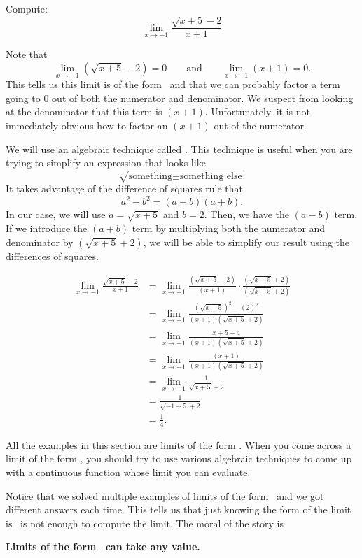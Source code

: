 \documentclass{ximera}
\begin{document}
\begin{example}
  Compute:
  \[
  \lim_{x\to-1} \frac{\sqrt{x+5}-2}{x+1}
  \]

\begin{explanation} 
  Note that 
  \[
  \lim_{x\to-1} \left(\sqrt{x+5}-2\right)=0\qquad\text{and}\qquad\lim_{x\to -1} \left(x+1\right) =0.
  \]
  This tells us this limit is of the form \zeroOverZero\ and that we
  can probably factor a term going to $0$ out of both the numerator
  and denominator.  We suspect from looking at the denominator that
  this term is $(x+1)$.  Unfortunately, it is not immediately obvious
  how to factor an $(x+1)$ out of the numerator.
 
  We will use an algebraic technique called .  This technique is useful when you are trying to
  simplify an expression that looks like
  \[
  \sqrt{\text{something} \pm \text{something else}}.
  \]
  It takes advantage of the difference of squares rule that
  \[
  a^2-b^2=(a-b)(a+b).
  \]
  In our case, we will use $a=\sqrt{x+5}$ and $b=2$.  Then, we have
  the $(a-b)$ term.  If we introduce the $(a+b)$ term by multiplying
  both the numerator and denominator by $(\sqrt{x+5}+2)$, we will be
  able to simplify our result using the differences of squares.
 
\begin{align*}
\lim_{x\to-1} \frac{\sqrt{x+5}-2}{x+1}&=
\lim_{x\to-1} \frac{(\sqrt{x+5}-2)}{(x+1)} \cdot \frac{(\sqrt{x+5}+2)}{(\sqrt{x+5}+2)} \\
&=\lim_{x\to-1} \frac{(\sqrt{x+5})^2-(2)^2}{(x+1)(\sqrt{x+5}+2)} \\
&=\lim_{x\to-1} \frac{x+5-4}{(x+1)(\sqrt{x+5}+2)} \\
&=\lim_{x\to-1} \frac{(x+1)}{(x+1)(\sqrt{x+5}+2)} \\
&=\lim_{x\to-1} \frac{1}{\sqrt{x+5}+2}\\
&= \frac{1}{\sqrt{-1+5}+2}\\
&=\frac{1}{4}.
\end{align*}
\end{explanation}
\end{example}

All the examples in this section are limits of the form \zeroOverZero.
When you come across a limit of the form \zeroOverZero, you should try
to use various algebraic techniques to come up with a continuous
function whose limit you can evaluate.

Notice that we solved multiple examples of limits of the form
\zeroOverZero\ and we got different answers each time.  This tells us
that just knowing the form of the limit is \zeroOverZero\ is not enough
to compute the limit. The moral of the story is
\begin{center}
  \textbf{Limits of the form \zeroOverZero\ can take any value.}
\end{center}
\end{document}
